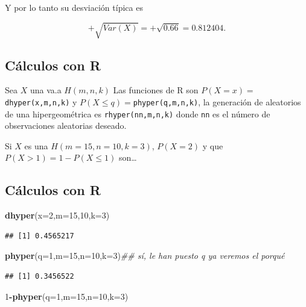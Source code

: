 \documentclass[]{book}
\newenvironment{Shaded}{\begin{snugshade}}{\end{snugshade}}
\newcommand{\CommentTok}[1]{\textcolor[rgb]{0.56,0.35,0.01}{\textit{#1}}}
\newcommand{\DataTypeTok}[1]{\textcolor[rgb]{0.13,0.29,0.53}{#1}}
\newcommand{\DecValTok}[1]{\textcolor[rgb]{0.00,0.00,0.81}{#1}}
\newcommand{\KeywordTok}[1]{\textcolor[rgb]{0.13,0.29,0.53}{\textbf{#1}}}
\newcommand{\NormalTok}[1]{#1}
\newcommand{\OperatorTok}[1]{\textcolor[rgb]{0.81,0.36,0.00}{\textbf{#1}}}
\begin{document}
Y por lo tanto su desviación típica es

\[
+\sqrt{Var(X)}=+\sqrt{0.66}=0.812404.
\]

\hypertarget{cuxe1lculos-con-r-10}{%
\subsection{Cálculos con R}\label{cuxe1lculos-con-r-10}}

Sea \(X\) una va.a \(H(m,n,k)\) Las funciones de R son \(P(X=x)=\)\texttt{dhyper(x,m,n,k)} y \(P(X\leq q)=\)\texttt{phyper(q,m,n,k)}, la generación de aleatorios de una hipergeométrica es \texttt{rhyper(nn,m,n,k)} donde \texttt{nn} es el número de observaciones aleatorias deseado.

Si \(X\) es una \(H(m=15,n=10,k=3)\), \(P(X=2)\) y que \(P(X>1)=1-P(X\leq 1)\) son\ldots{}

\hypertarget{cuxe1lculos-con-r-11}{%
\subsection{Cálculos con R}\label{cuxe1lculos-con-r-11}}

\begin{Shaded}
\begin{Highlighting}[]
\KeywordTok{dhyper}\NormalTok{(}\DataTypeTok{x=}\DecValTok{2}\NormalTok{,}\DataTypeTok{m=}\DecValTok{15}\NormalTok{,}\DecValTok{10}\NormalTok{,}\DataTypeTok{k=}\DecValTok{3}\NormalTok{)}
\end{Highlighting}
\end{Shaded}

\begin{verbatim}
## [1] 0.4565217
\end{verbatim}

\begin{Shaded}
\begin{Highlighting}[]
\KeywordTok{phyper}\NormalTok{(}\DataTypeTok{q=}\DecValTok{1}\NormalTok{,}\DataTypeTok{m=}\DecValTok{15}\NormalTok{,}\DataTypeTok{n=}\DecValTok{10}\NormalTok{,}\DataTypeTok{k=}\DecValTok{3}\NormalTok{)}\CommentTok{## sí, le han puesto q ya veremos el porqué}
\end{Highlighting}
\end{Shaded}

\begin{verbatim}
## [1] 0.3456522
\end{verbatim}

\begin{Shaded}
\begin{Highlighting}[]
\DecValTok{1}\OperatorTok{-}\KeywordTok{phyper}\NormalTok{(}\DataTypeTok{q=}\DecValTok{1}\NormalTok{,}\DataTypeTok{m=}\DecValTok{15}\NormalTok{,}\DataTypeTok{n=}\DecValTok{10}\NormalTok{,}\DataTypeTok{k=}\DecValTok{3}\NormalTok{)}
\end{Highlighting}
\end{Shaded}
\end{document}
